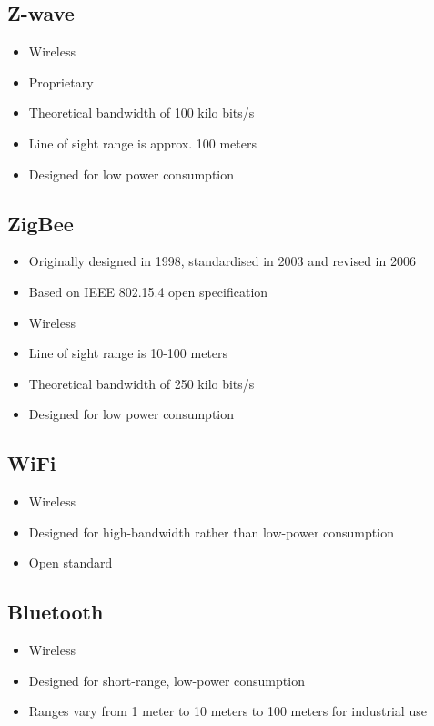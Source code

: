 \subsection{Z-wave} \cite{wiki_zwave}

\begin{itemize}
\item Wireless
\item Proprietary
\item Theoretical bandwidth of 100 kilo bits/s
\item Line of sight range is approx. 100 meters
\item Designed for low power consumption
\end{itemize}


\subsection{ZigBee} \cite{wiki_zigbee}

\begin{itemize}
\item Originally designed in 1998, standardised in 2003 and revised in 2006
\item Based on IEEE 802.15.4 open specification
\item Wireless
\item Line of sight range is 10-100 meters
\item Theoretical bandwidth of 250 kilo bits/s
\item Designed for low power consumption
\end{itemize}

\subsection{WiFi} \cite{wiki_wifi}

\begin{itemize}
\item Wireless
\item Designed for high-bandwidth rather than low-power consumption
\item Open standard
\end{itemize}


\subsection{Bluetooth} \cite{wiki_bluetooth}

\begin{itemize}
\item Wireless
\item Designed for short-range, low-power consumption
\item Ranges vary from 1 meter to 10 meters to 100 meters for industrial use
\end{itemize}


